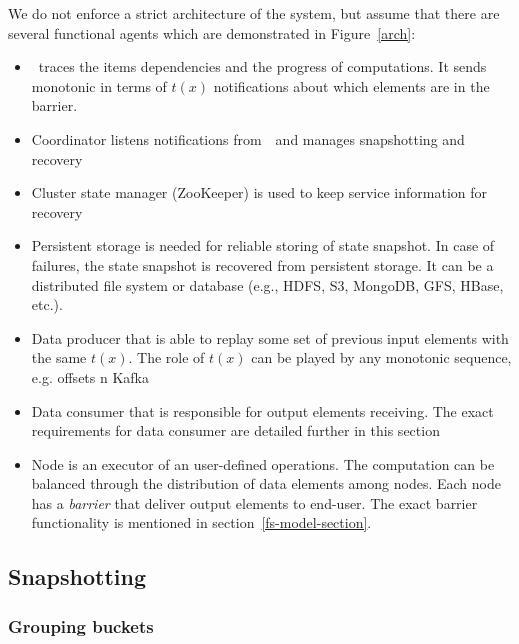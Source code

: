 We do not enforce a strict architecture of the system, but assume that there are several functional agents which are demonstrated in Figure~\ref{arch}:
\begin{itemize}
    \item \Acker\ traces the items dependencies and the progress of computations. It sends monotonic in terms of $t(x)$ notifications about which elements are in the barrier.
    \item Coordinator listens notifications from~\Acker\ and manages snapshotting and recovery
    \item Cluster state manager (ZooKeeper) is used to keep service information for recovery
    \item Persistent storage is needed for reliable storing of state snapshot. In case of failures, the state snapshot is recovered from persistent storage. It can be a distributed file system or database (e.g., HDFS, S3, MongoDB, GFS, HBase, etc.).
    \item Data producer that is able to replay some set of previous input elements with the same $t(x)$. The role of $t(x)$ can be played by any monotonic sequence, e.g. offsets n Kafka
    \item Data consumer that is responsible for output elements receiving. The exact requirements for data consumer are detailed further in this section
    \item Node is an executor of an user-defined operations. The computation can be balanced through the distribution of data elements among nodes. Each node has a {\em barrier} that deliver output elements to end-user. The exact barrier functionality is mentioned in section~\ref{fs-model-section}.
\end{itemize}

\subsection{Snapshotting}

\subsubsection{Grouping buckets}

